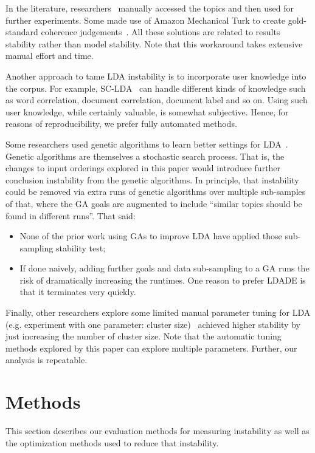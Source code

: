\documentclass[twocolumn,5p,sort&compress]{elsarticle}
\newcommand{\bi}{\begin{itemize}}
\newcommand{\ei}{\end{itemize}}
\theoremstyle{break}
\begin{document}
In the literature, researchers~\cite{maskeri2008mining, martin2015app, guzman2014users}
    manually accessed the topics and then used for further experiments. Some
    made use of Amazon Mechanical Turk to create gold-standard coherence
    judgements~\cite{lau2014machine}. All these solutions are related to results
    stability rather than model stability.
    Note that this workaround takes extensive manual effort and time.

    
    Another approach to tame LDA instability
    is to incorporate
    user knowledge into the corpus. For example,
    SC-LDA~\cite{yang2015improving} can
    handle different kinds of knowledge such as word correlation,
    document correlation, document label and so on. Using such user
    knowledge, while certainly valuable, is somewhat subjective.
    Hence, for reasons of reproducibility, we prefer fully
    automated methods.

Some researchers 
used
genetic
algorithms to learn better settings for LDA~\cite{panichella2013effectively,lohar2013improving,sun2015msr4sm}.
Genetic algorithms are 
themselves a stochastic search process. That is, the changes to 
input orderings explored in this paper would introduce further conclusion instability
from the genetic algorithms.
In principle, that instability could be removed via extra  runs of genetic algorithms 
over multiple sub-samples of that, where the GA goals are augmented to include
``similar topics should be found in different runs''.
That said:
\bi
\item None of the prior work using GAs to improve LDA have applied those sub-sampling stability test;
\item If done naively, adding further goals and data sub-sampling to a GA runs the risk
  of dramatically increasing the runtimes.
One reason to prefer LDADE is that it terminates very quickly.
\ei
Finally, other researchers explore
some limited manual parameter tuning for LDA
(e.g. experiment with one parameter: cluster size)~\cite{galvis2013analysis, tian2009using}
achieved higher stability by just increasing the number of cluster size.
Note that the automatic tuning methods explored by this paper can
explore multiple parameters. Further, our analysis is repeatable.

\section{Methods}
\label{sect:evaluation}
This section describes our evaluation methods for measuring instability as well as the optimization
methods used to reduce that instability.
\end{document}
